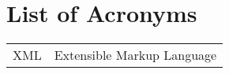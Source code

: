 \section{List of Acronyms}\label{appendix:acronyms}
\begin{longtable}{ll}
XML	&Extensible Markup Language\\
\end{longtable}
